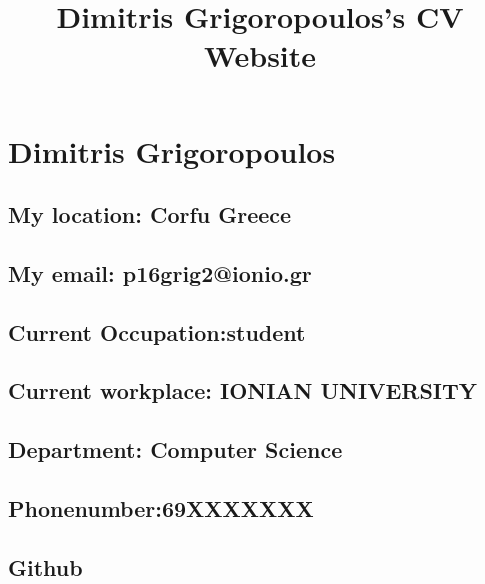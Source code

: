 \documentclass[]{article}
\title{Dimitris Grigoropoulos's CV Website}
\date{}
\begin{document}
\maketitle

\hypertarget{dimitris-grigoropoulos}{%
\section{Dimitris Grigoropoulos}\label{dimitris-grigoropoulos}}

\hypertarget{my-location-corfu-greece}{%
\subsection{My location: Corfu Greece}\label{my-location-corfu-greece}}

\hypertarget{my-email-p16grig2ionio.gr}{%
\subsection{My email:
p16grig2@ionio.gr}\label{my-email-p16grig2ionio.gr}}

\hypertarget{current-occupationstudent}{%
\subsection{Current
Occupation:student}\label{current-occupationstudent}}

\hypertarget{current-workplace-ionian-university}{%
\subsection{Current workplace: IONIAN
UNIVERSITY}\label{current-workplace-ionian-university}}

\hypertarget{department-computer-science}{%
\subsection{Department: Computer
Science}\label{department-computer-science}}

\hypertarget{phonenumber69xxxxxxx}{%
\subsection{Phonenumber:69XXXXXXX}\label{phonenumber69xxxxxxx}}

\hypertarget{github}{%
\subsection{Github}\label{github}}
\end{document}
